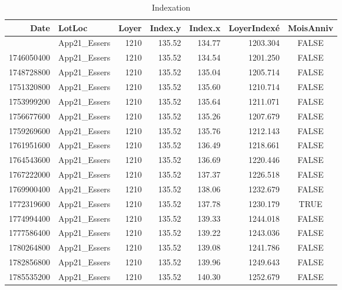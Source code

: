 \documentclass[
]{article}
\begin{document}
\begin{table}[t]
\caption*{
{\fontsize{20}{25}\selectfont  Indexation\fontsize{12}{15}\selectfont }
} 
\fontsize{12.0pt}{14.0pt}\selectfont
\begin{tabular*}{\linewidth}{@{\extracolsep{\fill}}rlrrrrc}
\toprule
Date & LotLoc & Loyer & Index.y & Index.x & LoyerIndexé & MoisAnniv \\ 
\midrule\addlinespace[2.5pt]
1743458400 & App21\_Essers & 1210 & 135.52 & 134.77 & 1203.304 & FALSE \\ 
1746050400 & App21\_Essers & 1210 & 135.52 & 134.54 & 1201.250 & FALSE \\ 
1748728800 & App21\_Essers & 1210 & 135.52 & 135.04 & 1205.714 & FALSE \\ 
1751320800 & App21\_Essers & 1210 & 135.52 & 135.60 & 1210.714 & FALSE \\ 
1753999200 & App21\_Essers & 1210 & 135.52 & 135.64 & 1211.071 & FALSE \\ 
1756677600 & App21\_Essers & 1210 & 135.52 & 135.26 & 1207.679 & FALSE \\ 
1759269600 & App21\_Essers & 1210 & 135.52 & 135.76 & 1212.143 & FALSE \\ 
1761951600 & App21\_Essers & 1210 & 135.52 & 136.49 & 1218.661 & FALSE \\ 
1764543600 & App21\_Essers & 1210 & 135.52 & 136.69 & 1220.446 & FALSE \\ 
1767222000 & App21\_Essers & 1210 & 135.52 & 137.37 & 1226.518 & FALSE \\ 
1769900400 & App21\_Essers & 1210 & 135.52 & 138.06 & 1232.679 & FALSE \\ 
1772319600 & App21\_Essers & 1210 & 135.52 & 137.78 & 1230.179 & TRUE \\ 
1774994400 & App21\_Essers & 1210 & 135.52 & 139.33 & 1244.018 & FALSE \\ 
1777586400 & App21\_Essers & 1210 & 135.52 & 139.22 & 1243.036 & FALSE \\ 
1780264800 & App21\_Essers & 1210 & 135.52 & 139.08 & 1241.786 & FALSE \\ 
1782856800 & App21\_Essers & 1210 & 135.52 & 139.96 & 1249.643 & FALSE \\ 
1785535200 & App21\_Essers & 1210 & 135.52 & 140.30 & 1252.679 & FALSE \\ 
\bottomrule
\end{tabular*}
\end{table}
\end{document}
